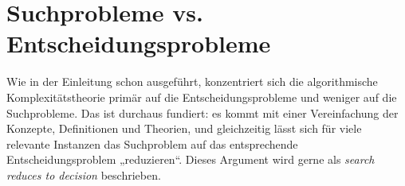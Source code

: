 

\section{Suchprobleme vs. Entscheidungsprobleme}

Wie in der Einleitung schon ausgeführt, konzentriert sich die algorithmische Komplexitätstheorie primär auf die Entscheidungsprobleme und weniger auf die Suchprobleme. Das ist durchaus fundiert: es kommt mit einer Vereinfachung der Konzepte, Definitionen und Theorien, und gleichzeitig lässt sich für viele relevante Instanzen das Suchproblem auf das entsprechende Entscheidungsproblem „reduzieren“. Dieses Argument wird gerne als \emph{search reduces to decision} beschrieben.

